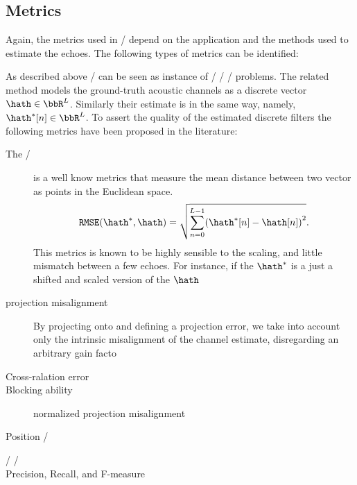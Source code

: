 

\subsection{Metrics}
Again, the metrics used in \AER/ depend on the application and the methods used to estimate the echoes.
The following types of metrics can be identified:

As described above \AER/ can be seen as instance of \FIR/ \SIMO/ \BCE/ problems.
The related method models the ground-truth acoustic channels as a discrete vector $\hath \in \bbR^L$.
Similarly their estimate is in the same way, namely, $\hath^{*}[n] \in \bbR^L$.
To assert the quality of the estimated discrete filters the following metrics have been proposed in the literature:
\begin{description}
    \item[The \RMSEtxt/] is a well know metrics that measure the mean distance between two vector as points in the Euclidean space.
    \begin{equation}
        \RMSE(\hath^{*}, \hath) = \sqrt{\sum_{n=0}^{L-1} \kparen{\hath^{*}[n] - \hath[n]}^2}
        .
    \end{equation}
    This metrics is known to be highly sensible to the scaling, and little mismatch between a few echoes.
    For instance, if the $\hath^{*}$ is a just a shifted and scaled version of the $\hath$
    \item[projection misalignment] By projecting onto and defining a projection error, we take into account only the intrinsic misalignment of the channel estimate, disregarding an arbitrary gain facto
    \item[Cross-ralation error]
    \item[Blocking ability]

    normalized projection misalignment~
\end{description}

\begin{description}
    \item[Position \RMSEtxt/]
    \item[]
\end{description}

\begin{description}
    \item[\TOAs/ \RMSEtxt/]
    \item[Precision, Recall, and F-measure]
\end{description}